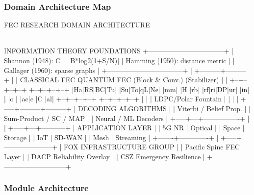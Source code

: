 \documentclass[11pt,letterpaper]{article}
\begin{document}
\subsubsection{Domain Architecture Map}

\begin{asciibox}
FEC RESEARCH DOMAIN ARCHITECTURE
===================================

  INFORMATION THEORY FOUNDATIONS
  +---------------------------------+
  | Shannon (1948): C = B*log2(1+S/N)|
  | Hamming (1950): distance metric  |
  | Gallager (1960): sparse graphs   |
  +---------------------------------+
                  |
        +---------+---------+
        |                   |
  CLASSICAL FEC          QUANTUM FEC
  (Block & Conv.)        (Stabilizer)
        |                   |
  +--+--+--+--+   +--+--+--+--+
  |Ha|RS|BC|Tu|   |Su|To|qL|Ne|
  |mm|  |H |rb|   |rf|ri|DP|ur|
  |in|  |  |o |   |ac|c |C |al|
  +--+--+--+--+   +--+--+--+--+
        |    |              |
   LDPC/Polar  Fountain      |
        |         |         |
  +-----+---------+---------+
  |   DECODING ALGORITHMS    |
  | Viterbi / Belief Prop.   |
  | Sum-Product / SC / MAP   |
  | Neural / ML Decoders     |
  +-----+---+----------------+
        |   |
  +-----+---+-----------+
  |   APPLICATION LAYER |
  | 5G NR | Optical     |
  | Space | Storage     |
  | IoT   | SD-WAN      |
  | Mesh  | Streaming   |
  +-------+-------------+
        |
  +-----+---------------------+
  |  FOX INFRASTRUCTURE GROUP |
  | Pacific Spine FEC Layer   |
  | DACP Reliability Overlay  |
  | CSZ Emergency Resilience  |
  +---------------------------+
\end{asciibox}

\subsubsection{Module Architecture}
\end{document}
